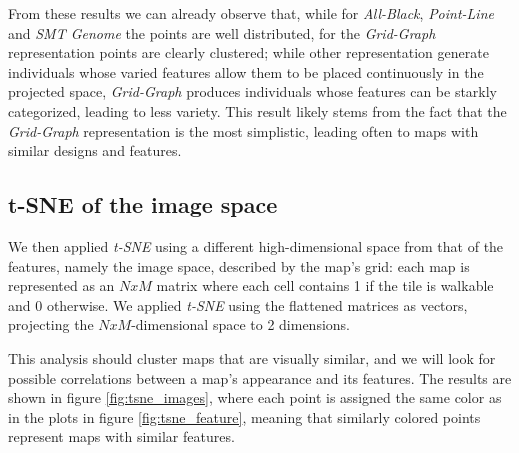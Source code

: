 From these results we can already observe that, while for \textit{All-Black}, \textit{Point-Line} and \textit{SMT Genome} the points are well distributed, for the \textit{Grid-Graph} representation points are clearly clustered; while other representation generate individuals whose varied features allow them to be placed continuously in the projected space, \textit{Grid-Graph} produces individuals whose features can be starkly categorized, leading to less variety. This result likely stems from the fact that the \textit{Grid-Graph} representation is the most simplistic, leading often to maps with similar designs and features.

\subsection{t-SNE of the image space}
We then applied \textit{t-SNE} using a different high-dimensional space from that of the features, namely the image space, described by the map's grid: each map is represented as an $NxM$ matrix where each cell contains 1 if the tile is walkable and 0 otherwise. We applied \textit{t-SNE} using the flattened matrices as vectors, projecting the $NxM$-dimensional space to 2 dimensions.

This analysis should cluster maps that are visually similar, and we will look for possible correlations between a map's appearance and its features. The results are shown in figure \cref{fig:tsne_images}, where each point is assigned the same color as in the plots in figure \cref{fig:tsne_feature}, meaning that similarly colored points represent maps with similar features.

